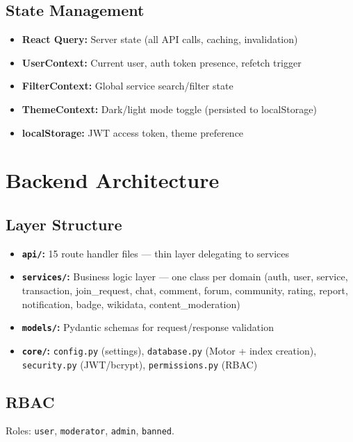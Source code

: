 \documentclass[11pt,a4paper]{report}
\begin{document}
\subsection{State Management}

\begin{itemize}
    \item \textbf{React Query:} Server state (all API calls, caching, invalidation)
    \item \textbf{UserContext:} Current user, auth token presence, refetch trigger
    \item \textbf{FilterContext:} Global service search/filter state
    \item \textbf{ThemeContext:} Dark/light mode toggle (persisted to localStorage)
    \item \textbf{localStorage:} JWT access token, theme preference
\end{itemize}

\section{Backend Architecture}

\subsection{Layer Structure}

\begin{itemize}
    \item \textbf{\texttt{api/}:} 15 route handler files --- thin layer delegating to services
    \item \textbf{\texttt{services/}:} Business logic layer --- one class per domain (auth, user, service, transaction, join\_request, chat, comment, forum, community, rating, report, notification, badge, wikidata, content\_moderation)
    \item \textbf{\texttt{models/}:} Pydantic schemas for request/response validation
    \item \textbf{\texttt{core/}:} \texttt{config.py} (settings), \texttt{database.py} (Motor + index creation), \texttt{security.py} (JWT/bcrypt), \texttt{permissions.py} (RBAC)
\end{itemize}

\subsection{RBAC}

Roles: \texttt{user}, \texttt{moderator}, \texttt{admin}, \texttt{banned}.
\end{document}
